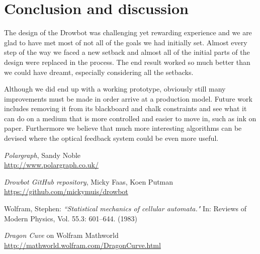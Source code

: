 \documentclass[a4paper,10pt]{article}
\begin{document}
\section{Conclusion and discussion}
\label{sec:conclusion}




The design of the Drowbot was challenging yet rewarding experience 
and we are glad to have met most of not all of the goals we had initially set.
Almost every step of the way we faced a new setback and almost all
of the initial parts of the design were replaced in the process.
The end result worked so much better than we could have dreamt,
especially considering all the setbacks.

Although we did end up with a working prototype, 
obviously still many improvements must be made in order arrive at a production model. 
Future work includes removing it from its blackboard and chalk
constraints and see what it can do on a medium that is
more controlled and easier to move in, such as ink on paper. 
Furthermore we believe that much more interesting algorithms can be devised 
where the optical feedback system could be even more useful.


\begin{thebibliography}{9}

  \textit{Polargraph}, Sandy Noble
  \\\url{http://www.polargraph.co.uk/}

  \textit{Drowbot GitHub repository}, Micky Faas, Koen Putman
  \\\url{https://github.com/mickymuis/drowbot}

Wolfram, Stephen:
\textit{``Statistical mechanics of cellular automata."}
In: Reviews of Modern Physics, Vol. 55.3: 601--644.
(1983)

\textit{Dragon Cuve} on Wolfram Mathworld
\\\url{http://mathworld.wolfram.com/DragonCurve.html}

\end{thebibliography}
\end{document}
